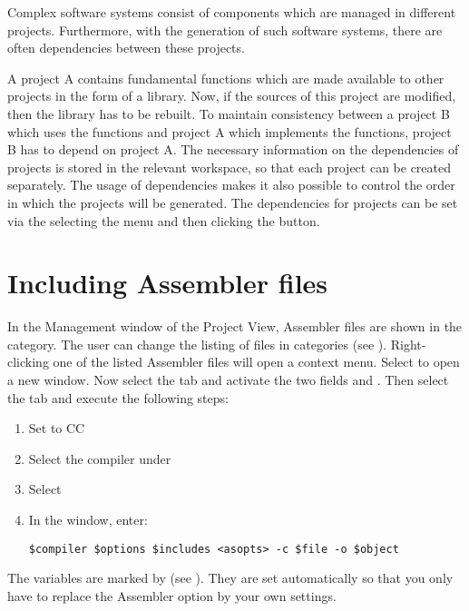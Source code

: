 Complex software systems consist of components which are managed in different \codeblocks projects. Furthermore, with the generation of such software systems, there are often dependencies between these projects.


A project A contains fundamental functions which are made available to other projects in the form of a library. Now, if the sources of this project are modified, then the library has to be rebuilt. To maintain consistency between a project B which uses the functions and project A which implements the functions, project B has to depend on project A. The necessary information on the dependencies of projects is stored in the relevant workspace, so that each project can be created separately. The usage of dependencies makes it also possible to control the order in which the projects will be generated. The dependencies for projects can be set via the selecting the menu  and then clicking the  button.

\section{Including Assembler files}

In the Management window of the Project View, Assembler files are shown in the  category. The user can change the listing of files in categories (see ). Right-clicking one of the listed Assembler files will open a context menu. Select  to open a new window. Now select the  tab and activate the two fields  and . Then select the  tab and execute the following steps:

\begin{enumerate}
\item Set  to CC
\item Select the compiler under 
\item Select 
\item In the window, enter:
\begin{lstlisting}
$compiler $options $includes <asopts> -c $file -o $object
\end{lstlisting}
\end{enumerate}

The \codeblocks variables are marked by \codeline{$} (see ). They are set automatically so that you only have to replace the Assembler option  by your own settings.

